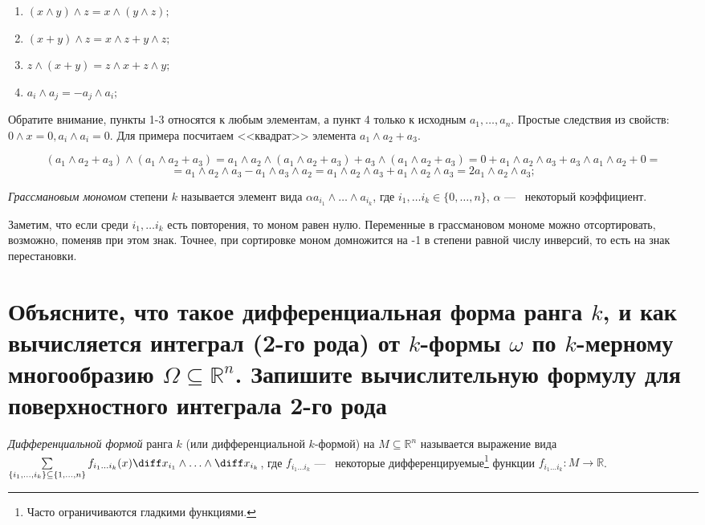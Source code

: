 \documentclass{article}
\begin{document}
	\begin{enumerate}
		\item $(x \land y) \land z = x \land (y \land z);$
		\item $(x + y) \land z = x \land z + y \land z;$
		\item $z \land (x + y) = z \land x + z \land y;$
		\item $a_i \land a_j = -a_j \land a_i;$
	\end{enumerate}

	Обратите внимание, пункты 1-3 относятся к любым элементам, а пункт 4 только к исходным $a_1, \ldots, a_n$. Простые следствия из свойств: $0 \land x = 0, a_i \land a_i = 0$. Для примера посчитаем <<квадрат>> элемента $a_1 \land a_2 + a_3$.
	
	\[ (a_1 \land a_2 + a_3) \land (a_1 \land a_2 + a_3) = a_1 \land a_2 \land (a_1 \land a_2 + a_3) + a_3 \land (a_1 \land a_2 + a_3) = 0 + a_1 \land a_2 \land a_3 + a_3 \land a_1 \land a_2 + 0 = \] \[ = a_1 \land a_2 \land a_3  - a_1 \land a_3 \land a_2 = a_1 \land a_2 \land a_3 + a_1 \land a_2 \land a_3 = 2a_1 \land a_2 \land a_3;\]

	\begin{definition}
		\textit{Грассмановым мономом} степени $k$ называется элемент вида $\alpha a_{i_1} \land \ldots \land a_{i_k}$, где $ i_1, \ldots i_k \in \{0, \ldots, n \}$, $\alpha$ ---~ некоторый коэффициент.
	\end{definition}

	Заметим, что если среди $i_1, \ldots i_k$ есть повторения, то моном равен нулю. Переменные в грассмановом мономе можно отсортировать, возможно, поменяв при этом знак. Точнее, при сортировке моном домножится на -1 в степени равной числу инверсий, то есть на знак перестановки.

	\section{Объясните, что такое дифференциальная форма ранга $k$, и как вычисляется интеграл (2-го рода) от $k$-формы $\omega$ по $k$-мерному многообразию $\Omega \subseteq \mathbb{R}^n$. Запишите вычислительную формулу для поверхностного интеграла 2-го рода}

	\begin{definition}
		\textit{Дифференциальной формой} ранга $k$ (или дифференциальной $k$-формой) на $M \subseteq \mathbb{R}^n$ называется выражение вида $\sum\limits_{\{i_1, \ldots, i_k\} \subseteq \{1, \ldots, n\}} f_{i_1 \ldots i_k}(x)\diff x_{i_1} \land \ldots \land \diff x_{i_k}$, где $f_{i_1\ldots i_k}$ ---~ некоторые дифференцируемые\footnote{Часто ограничиваются гладкими функциями.} функции $f_{i_1\ldots i_k}:M \to \mathbb{R}$.
	\end{definition}
\end{document}
